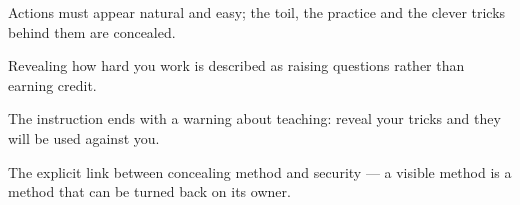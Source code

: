 

\begin{distilled}
  \item Actions must appear natural and easy; the toil, the practice and the clever tricks behind them are concealed.
  \item Revealing how hard you work is described as raising questions rather than earning credit.
  \item The instruction ends with a warning about teaching: reveal your tricks and they will be used against you.
\end{distilled}

\begin{unique}
  \item The explicit link between concealing method and security --- a visible method is a method that can be turned back on its owner.
\end{unique}
